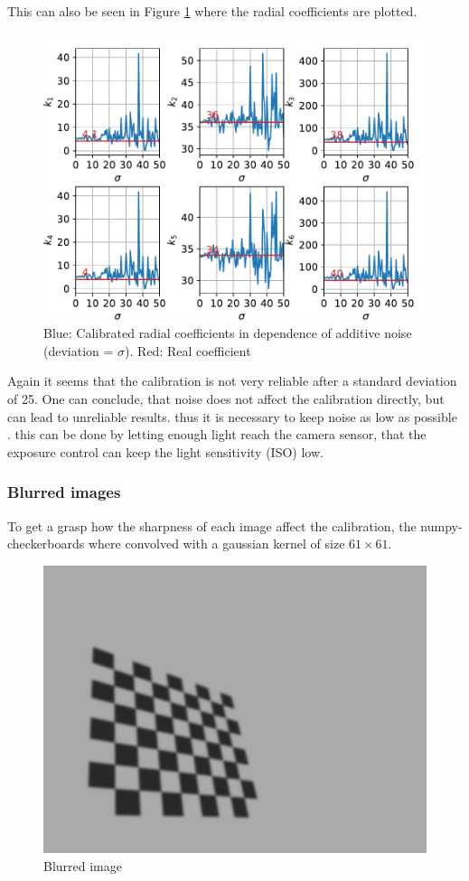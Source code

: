 This can also be seen in Figure \ref{development:noise_k} where the radial coefficients are plotted.
\begin{figure}
	\centering
	\includegraphics[width=0.9\linewidth]{3-development/calibration/images/noise_k.pdf}
	\caption{Blue: Calibrated radial coefficients in dependence of additive noise (deviation = $\sigma$). Red: Real coefficient\label{development:noise_k}}
\end{figure}
Again it seems that the calibration is not very reliable after a standard deviation of 25.
One can conclude, that noise does not affect the calibration directly, but can lead to unreliable results.
thus it is necessary to keep noise as low as possible .
this can be done by letting enough light reach the camera sensor, that the exposure control can keep the light sensitivity (ISO) low.

\subsubsection{Blurred images}
To get a grasp how the sharpness of each image affect the calibration, the numpy-checkerboards where convolved with a gaussian kernel of size $61\times 61$.

\begin{figure}[ht]
	\centering
	\includegraphics[width=0.9\linewidth]{3-development/calibration/images/nump1_blurred.png}
	\caption{Blurred image\label{development:nump_blurred}}
\end{figure}

